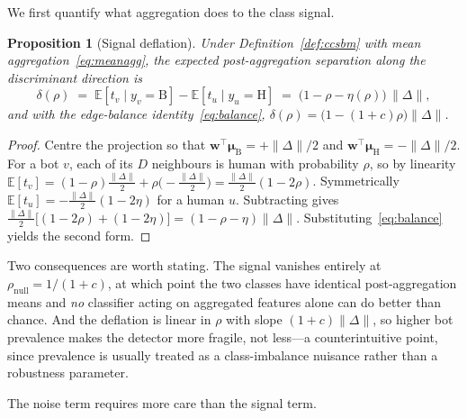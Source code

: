 \documentclass[onecolumn,pdflatex,sn-basic,Numbered]{sn-jnl}
\theoremstyle{thmstyleone}
\newtheorem{proposition}[theorem]{Proposition}
\theoremstyle{thmstylethree}
\begin{document}
We first quantify what aggregation does to the class signal.

\begin{proposition}[Signal deflation]
\label{prop:deflation}
Under Definition~\ref{def:ccsbm} with mean aggregation~\eqref{eq:meanagg}, the
expected post-aggregation separation along the discriminant direction is
\begin{equation}
    \delta(\rho) \;=\; \mathbb{E}[t_v \mid y_v = \mathrm{B}]
                     - \mathbb{E}[t_u \mid y_u = \mathrm{H}]
                \;=\; \bigl(1 - \rho - \eta(\rho)\bigr)\,\|\Delta\| ,
    \label{eq:deflation}
\end{equation}
and with the edge-balance identity~\eqref{eq:balance},
$\delta(\rho) = \bigl(1 - (1+c)\rho\bigr)\|\Delta\|$.
\end{proposition}

\begin{proof}
Centre the projection so that $\mathbf{w}^\top\boldsymbol{\mu}_{\mathrm{B}} =
+\|\Delta\|/2$ and $\mathbf{w}^\top\boldsymbol{\mu}_{\mathrm{H}} = -\|\Delta\|/2$.
For a bot $v$, each of its $D$ neighbours is human with probability $\rho$, so by
linearity
$\mathbb{E}[t_v] = (1-\rho)\tfrac{\|\Delta\|}{2} + \rho\bigl(-\tfrac{\|\Delta\|}{2}\bigr)
= \tfrac{\|\Delta\|}{2}(1-2\rho)$.
Symmetrically $\mathbb{E}[t_u] = -\tfrac{\|\Delta\|}{2}(1-2\eta)$ for a human $u$.
Subtracting gives $\tfrac{\|\Delta\|}{2}\bigl[(1-2\rho)+(1-2\eta)\bigr] =
(1-\rho-\eta)\|\Delta\|$. Substituting~\eqref{eq:balance} yields the second form.
\end{proof}

Two consequences are worth stating. The signal vanishes entirely at
$\rho_{\mathrm{null}} = 1/(1+c)$, at which point the two classes have identical
post-aggregation means and \emph{no} classifier acting on aggregated features
alone can do better than chance. And the deflation is linear in $\rho$ with slope
$(1+c)\|\Delta\|$, so higher bot prevalence makes the detector more fragile, not
less---a counterintuitive point, since prevalence is usually treated as a
class-imbalance nuisance rather than a robustness parameter.

The noise term requires more care than the signal term.
\end{document}
